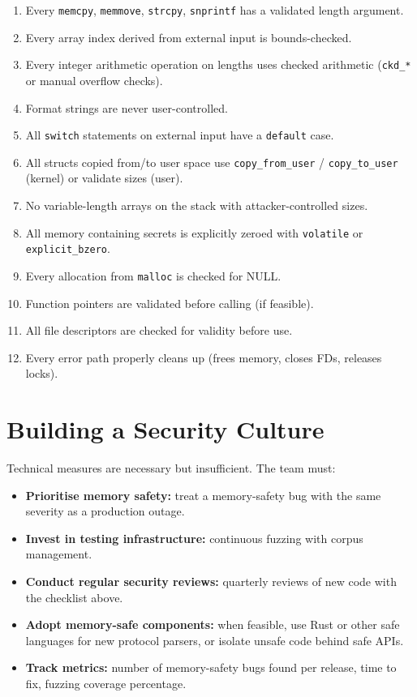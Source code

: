 \begin{enumerate}
	\item Every \texttt{memcpy}, \texttt{memmove}, \texttt{strcpy}, \texttt{snprintf} has a validated length argument.
	\item Every array index derived from external input is bounds-checked.
	\item Every integer arithmetic operation on lengths uses checked arithmetic (\texttt{ckd\_*} or manual overflow checks).
	\item Format strings are never user-controlled.
	\item All \texttt{switch} statements on external input have a \texttt{default} case.
	\item All structs copied from/to user space use \texttt{copy\_from\_user} / \texttt{copy\_to\_user} (kernel) or validate sizes (user).
	\item No variable-length arrays on the stack with attacker-controlled sizes.
	\item All memory containing secrets is explicitly zeroed with \texttt{volatile} or \texttt{explicit\_bzero}.
	\item Every allocation from \texttt{malloc} is checked for NULL.
	\item Function pointers are validated before calling (if feasible).
	\item All file descriptors are checked for validity before use.
	\item Every error path properly cleans up (frees memory, closes FDs, releases locks).
\end{enumerate}

\section{Building a Security Culture}

Technical measures are necessary but insufficient. The team must:

\begin{itemize}
	\item \textbf{Prioritise memory safety:} treat a memory-safety bug with the same severity as a production outage.
	\item \textbf{Invest in testing infrastructure:} continuous fuzzing with corpus management.
	\item \textbf{Conduct regular security reviews:} quarterly reviews of new code with the checklist above.
	\item \textbf{Adopt memory-safe components:} when feasible, use Rust or other safe languages for new protocol parsers, or isolate unsafe code behind safe APIs.
	\item \textbf{Track metrics:} number of memory-safety bugs found per release, time to fix, fuzzing coverage percentage.
\end{itemize}

